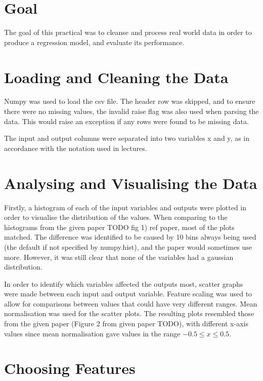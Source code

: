 \documentclass[12pt]{article}
\begin{document}
\part*{Goal}

The goal of this practical was to cleanse and process real world data in order to produce a regression model, and evaluate its performance. \citep{createreactapp}

\part{Loading and Cleaning the Data}

Numpy was used to load the csv file. The header row was skipped, and to ensure there were no missing values, the invalid raise flag was also used when parsing the data. This would raise an exception if any rows were found to be missing data. 

The input and output columns were separated into two variables x and y, as in accordance with the notation used in lectures.

\part{Analysing and Visualising the Data}

Firstly, a histogram of each of the input variables and outputs were plotted in order to visualise the distribution of the values. When comparing to the histograms from the given paper TODO fig 1) ref paper, most of the plots matched. The difference was identified to be caused by 10 bins always being used (the default if not specified by numpy.hist), and the paper would sometimes use more. However, it was still clear that none of the variables had a gaussian distribution.

In order to identify which variables affected the outputs most, scatter graphs were made between each input and output variable. Feature scaling was used to allow for comparisons between values that could have very different ranges. Mean normalisation was used for the scatter plots. The resulting plots resembled those from the given paper (Figure 2 from given paper TODO), with different x-axis values since mean normalisation gave values in the range $-0.5 \leq x \leq 0.5 $.

\part{Choosing Features}
\end{document}
